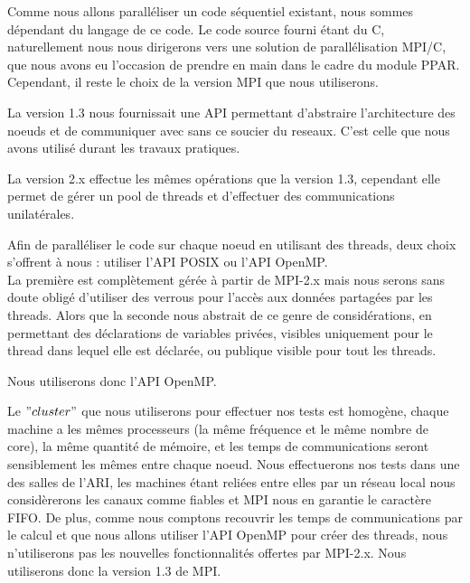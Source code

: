 \par Comme nous allons paralléliser un code séquentiel existant,
nous sommes dépendant du langage de ce code. Le code source fourni 
étant du C, naturellement nous nous dirigerons vers une solution 
de parallélisation MPI/C, que nous avons eu l'occasion de prendre 
en main dans le cadre du module PPAR. Cependant, il reste le choix de la 
version MPI que nous utiliserons.\\

\par La version 1.3 nous fournissait une API permettant d'abstraire 
l'architecture des noeuds et de communiquer avec sans ce soucier du reseaux. C'est
celle que nous avons utilisé durant les travaux pratiques.\\

\par La version 2.x effectue les mêmes opérations que la version 1.3,
cependant elle permet de gérer un pool de threads et d'effectuer des communications unilatérales.\\

\par Afin de paralléliser le code sur chaque noeud en utilisant des threads,
deux choix s'offrent à nous : utiliser l'API POSIX ou l'API OpenMP.\\
La première est complètement gérée à partir de MPI-2.x mais nous serons sans doute
obligé d'utiliser des verrous pour l'accès aux données partagées par les threads.
Alors que la seconde nous abstrait de ce genre de considérations, en permettant 
des déclarations de variables privées, visibles uniquement pour le thread dans lequel elle est déclarée, 
ou publique visible pour tout les threads.\\

\par Nous utiliserons donc l'API OpenMP.\\

\par Le $"cluster"$ que nous utiliserons pour effectuer nos tests 
est homogène, chaque machine a les mêmes processeurs (la même fréquence et le même nombre de core),
la même quantité de mémoire, et les temps de communications seront sensiblement 
les mêmes entre chaque noeud. Nous effectuerons nos tests dans une des salles 
de l'ARI, les machines étant reliées entre elles par un réseau local nous considèrerons 
les canaux comme fiables et MPI nous en garantie le caractère FIFO.
De plus, comme nous comptons recouvrir les temps
de communications par le calcul et que nous allons utiliser l'API OpenMP 
pour créer des threads, nous n'utiliserons pas les nouvelles fonctionnalités offertes
par MPI-2.x. Nous utiliserons donc la version 1.3 de MPI.\\

